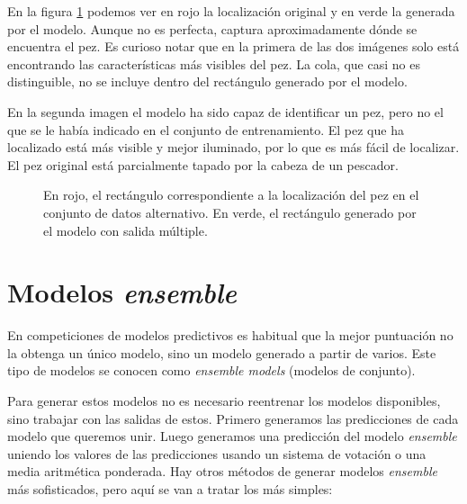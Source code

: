 En la figura \ref{predicted_boxes_1} podemos ver en rojo la localización original
y en verde la generada por el modelo. Aunque no es perfecta, captura
aproximadamente dónde se encuentra el pez. Es curioso notar que en la primera de
las dos imágenes solo está encontrando las características más visibles del pez.
La cola, que casi no es distinguible, no se incluye dentro del rectángulo
generado por el modelo.

En la segunda imagen el modelo ha sido capaz de identificar un pez, pero no el que
se le había indicado en el conjunto de entrenamiento. El pez que ha localizado
está más visible y mejor iluminado, por lo que es más fácil de localizar. El pez
original está parcialmente tapado por la cabeza de un pescador.

\begin{figure}
  \caption{En rojo, el rectángulo correspondiente a la localización del pez en
  el conjunto de datos alternativo. En verde, el rectángulo generado por el
  modelo con salida múltiple.}
\label{predicted_boxes_1}
\end{figure}


\section{Modelos \textit{ensemble}}

En competiciones de modelos predictivos es habitual que la mejor puntuación
no la obtenga un único modelo, sino un modelo generado a partir de varios. Este
tipo de modelos se conocen como \textit{ensemble models} (modelos de conjunto).

Para generar estos modelos no es necesario reentrenar los modelos disponibles, sino
trabajar con las salidas de estos. Primero generamos las predicciones de cada
modelo que queremos unir. Luego generamos una predicción del modelo
\textit{ensemble} uniendo los valores de las predicciones usando un sistema de
votación o una media aritmética ponderada. Hay otros métodos de generar modelos
\textit{ensemble} más sofisticados, pero aquí se van a tratar los más simples:

